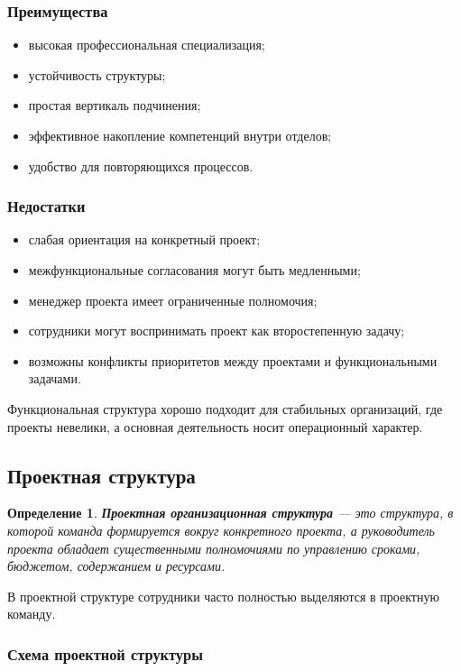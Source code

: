 \documentclass[12pt,a4paper]{article}
\newtheorem{definition}{Определение}
\begin{document}
\subsubsection*{Преимущества}
\begin{itemize}
    \item высокая профессиональная специализация;
    \item устойчивость структуры;
    \item простая вертикаль подчинения;
    \item эффективное накопление компетенций внутри отделов;
    \item удобство для повторяющихся процессов.
\end{itemize}

\subsubsection*{Недостатки}
\begin{itemize}
    \item слабая ориентация на конкретный проект;
    \item межфункциональные согласования могут быть медленными;
    \item менеджер проекта имеет ограниченные полномочия;
    \item сотрудники могут воспринимать проект как второстепенную задачу;
    \item возможны конфликты приоритетов между проектами и функциональными задачами.
\end{itemize}

Функциональная структура хорошо подходит для стабильных организаций, где проекты невелики, а основная деятельность носит операционный характер.

\subsection{Проектная структура}

\begin{definition}
\textbf{Проектная организационная структура} --- это структура, в которой команда формируется вокруг конкретного проекта, а руководитель проекта обладает существенными полномочиями по управлению сроками, бюджетом, содержанием и ресурсами.
\end{definition}

В проектной структуре сотрудники часто полностью выделяются в проектную команду.

\subsubsection*{Схема проектной структуры}
\end{document}
